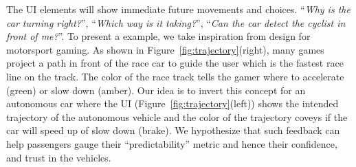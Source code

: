 The UI elements will show immediate future movements and choices. ``\textit{Why is the car turning right?}'', ``\textit{Which way is it taking?}'', ``\textit{Can the car detect the cyclist in front of me?}''.
To present a example, we take inspiration from design for motorsport gaming. As shown in Figure~\ref{fig:trajectory}(right), many games project a path in front of the race car to guide the user which is the fastest race line on the track. The color of the race track tells the gamer where to accelerate (green) or slow down (amber). Our idea is to invert this concept for an autonomous car where the UI (Figure~\ref{fig:trajectory}(left)) shows the intended trajectory of the autonomous vehicle and the color of the trajectory coveys if the car will speed up of slow down (brake). We hypothesize that such feedback can help passengers gauge their ``predictability'' metric and hence their confidence, and trust in the vehicles. 


